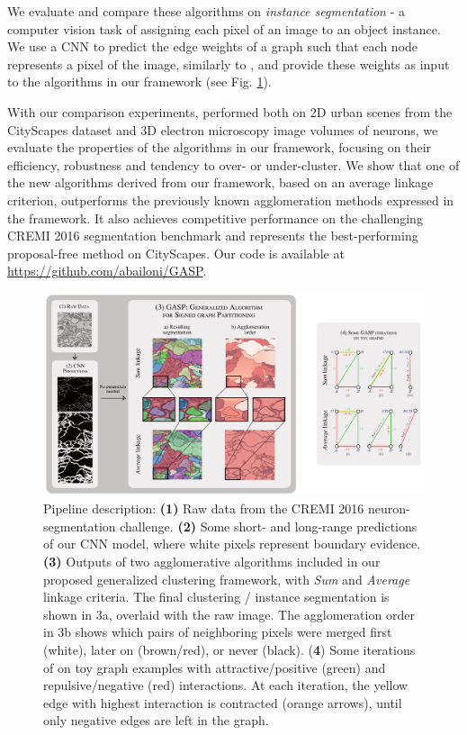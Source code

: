 We evaluate and compare these algorithms on \emph{instance segmentation} - a computer vision task of assigning each pixel of an image to an object instance. 
We use a CNN to predict the edge weights of a graph such that each node represents a pixel of the image, similarly to \cite{liu2018affinity,lee2017superhuman,wolf2018mutex}, and provide these weights as input to the algorithms in our framework (see Fig. \ref{fig:intro_figure}). 


With our comparison experiments, performed both on 2D urban scenes from the CityScapes dataset and 3D electron microscopy image volumes of neurons, we evaluate the properties of the algorithms in our framework, focusing on their efficiency, robustness and tendency to over- or under-cluster.
We show that one of the new algorithms derived from our framework, based on an average linkage criterion, outperforms the previously known agglomeration methods expressed in the framework. It also achieves competitive performance on the challenging CREMI 2016 segmentation benchmark and represents the best-performing proposal-free method on CityScapes.
Our code is available at \url{https://github.com/abailoni/GASP}.


\begin{figure}[t]
\centering
\includegraphics[width=\textwidth]{./figs/intro_image_v3.pdf} %
\caption{ Pipeline description: \textbf{(1)} Raw data from the CREMI 2016 neuron-segmentation challenge. \textbf{(2)} Some short- and long-range predictions of our CNN model, where white pixels represent boundary evidence. \textbf{(3)} Outputs of two agglomerative algorithms included in our proposed generalized clustering framework, with \emph{Sum} and \emph{Average} linkage criteria. The final clustering / instance segmentation is shown in 3a, overlaid with the raw image.  The  agglomeration order in 3b shows which pairs of neighboring pixels were merged first (white), later on (brown/red), or never (black). (\textbf{4}) Some iterations of \algname{} on toy graph examples with attractive/positive (green) and repulsive/negative (red) interactions. At each iteration, the yellow edge with highest interaction is contracted (orange arrows), until only negative edges are left in the graph.
\label{fig:intro_figure}}
\end{figure}
